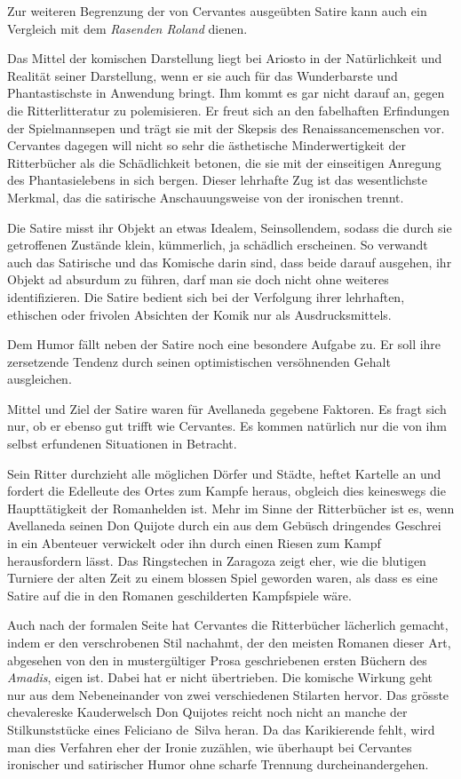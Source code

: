 Zur weiteren Begrenzung der von Cervantes ausgeübten Satire kann
auch ein Vergleich mit dem {\it Rasenden Roland} dienen.

{\quoted Das Mittel der komischen Darstellung liegt bei Ariosto in der
Natürlichkeit und Realität seiner Darstellung, wenn er sie auch für das
Wunderbarste und Phantastischste in Anwendung bringt}. Ihm kommt
es gar nicht darauf an, gegen die Ritterlitteratur zu polemisieren. Er
freut sich an den fabelhaften Erfindungen der Spielmannsepen und trägt
sie mit der Skepsis des Renaissancemenschen vor. Cervantes dagegen
will nicht so sehr die ästhetische Minderwertigkeit der Ritterbücher als
die Schädlichkeit betonen, die sie mit der einseitigen Anregung des
Phantasielebens in sich bergen. Dieser lehrhafte Zug ist das wesentlichste
Merkmal, das die satirische Anschauungsweise von der ironischen trennt.

Die Satire misst ihr Objekt an etwas Idealem, Seinsollendem, sodass
die durch sie getroffenen Zustände klein, kümmerlich, ja schädlich
erscheinen. So verwandt auch das Satirische und das Komische darin
sind, dass beide darauf ausgehen, ihr Objekt ad absurdum zu führen,
darf man sie doch nicht ohne weiteres identifizieren. Die Satire bedient
sich bei der Verfolgung ihrer lehrhaften, ethischen oder frivolen Absichten
der Komik nur als Ausdrucksmittels.

Dem Humor fällt neben der Satire noch eine besondere Aufgabe
zu. Er soll ihre zersetzende Tendenz durch seinen optimistischen
versöhnenden Gehalt ausgleichen.

Mittel und Ziel der Satire waren für Avellaneda gegebene Faktoren.
Es fragt sich nur, ob er ebenso gut trifft wie Cervantes. Es
kommen natürlich nur die von ihm selbst erfundenen Situationen
in Betracht.

Sein Ritter durchzieht alle möglichen Dörfer und Städte, heftet
Kartelle an und fordert die Edelleute des Ortes zum Kampfe heraus,
obgleich dies keineswegs die Haupttätigkeit der Romanhelden ist. Mehr
im Sinne der Ritterbücher ist es, wenn Avellaneda seinen Don Quijote
durch ein aus dem Gebüsch dringendes Geschrei in ein Abenteuer verwickelt
oder ihn durch einen Riesen zum Kampf herausfordern lässt.
Das Ringstechen in Zaragoza zeigt eher, wie die blutigen Turniere der
alten Zeit zu einem blossen Spiel geworden waren, als dass es eine Satire
auf die in den Romanen geschilderten Kampfspiele wäre.

Auch nach der formalen Seite hat Cervantes die Ritterbücher lächerlich
gemacht, indem er den verschrobenen Stil nachahmt, der den meisten
Romanen dieser Art, abgesehen von den in mustergültiger Prosa geschriebenen
ersten Büchern des {\it Amadis}, eigen ist. Dabei hat er nicht
übertrieben. Die komische Wirkung geht nur aus dem Nebeneinander
von zwei verschiedenen Stilarten hervor. Das grösste chevalereske Kauderwelsch
Don Quijotes reicht noch nicht an manche der Stilkunststücke
eines Feliciano de~Silva heran. Da das Karikierende fehlt, wird man dies
Verfahren eher der Ironie zuzählen, wie überhaupt bei Cervantes ironischer
und satirischer Humor ohne scharfe Trennung durcheinandergehen.

